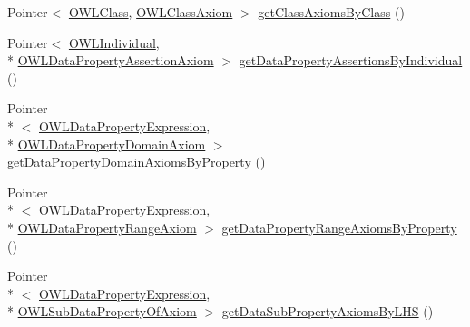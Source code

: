 \begin{DoxyCompactItemize}
\item 
Pointer$<$ \hyperlink{interfaceorg_1_1semanticweb_1_1owlapi_1_1model_1_1_o_w_l_class}{O\-W\-L\-Class}, \hyperlink{interfaceorg_1_1semanticweb_1_1owlapi_1_1model_1_1_o_w_l_class_axiom}{O\-W\-L\-Class\-Axiom} $>$ \hyperlink{interfaceuk_1_1ac_1_1manchester_1_1cs_1_1owl_1_1owlapi_1_1_internals_af7ca9f58be718b9bfabcc28252f50591}{get\-Class\-Axioms\-By\-Class} ()
\item 
Pointer$<$ \hyperlink{interfaceorg_1_1semanticweb_1_1owlapi_1_1model_1_1_o_w_l_individual}{O\-W\-L\-Individual}, \\*
\hyperlink{interfaceorg_1_1semanticweb_1_1owlapi_1_1model_1_1_o_w_l_data_property_assertion_axiom}{O\-W\-L\-Data\-Property\-Assertion\-Axiom} $>$ \hyperlink{interfaceuk_1_1ac_1_1manchester_1_1cs_1_1owl_1_1owlapi_1_1_internals_ae224a024cfa42f2b7fed95f3a96d6c32}{get\-Data\-Property\-Assertions\-By\-Individual} ()
\item 
Pointer\\*
$<$ \hyperlink{interfaceorg_1_1semanticweb_1_1owlapi_1_1model_1_1_o_w_l_data_property_expression}{O\-W\-L\-Data\-Property\-Expression}, \\*
\hyperlink{interfaceorg_1_1semanticweb_1_1owlapi_1_1model_1_1_o_w_l_data_property_domain_axiom}{O\-W\-L\-Data\-Property\-Domain\-Axiom} $>$ \hyperlink{interfaceuk_1_1ac_1_1manchester_1_1cs_1_1owl_1_1owlapi_1_1_internals_aa35c100aca490066ebbd59464cb808f5}{get\-Data\-Property\-Domain\-Axioms\-By\-Property} ()
\item 
Pointer\\*
$<$ \hyperlink{interfaceorg_1_1semanticweb_1_1owlapi_1_1model_1_1_o_w_l_data_property_expression}{O\-W\-L\-Data\-Property\-Expression}, \\*
\hyperlink{interfaceorg_1_1semanticweb_1_1owlapi_1_1model_1_1_o_w_l_data_property_range_axiom}{O\-W\-L\-Data\-Property\-Range\-Axiom} $>$ \hyperlink{interfaceuk_1_1ac_1_1manchester_1_1cs_1_1owl_1_1owlapi_1_1_internals_a5ee110f1db6a236e5c2fa40f7b8a09b1}{get\-Data\-Property\-Range\-Axioms\-By\-Property} ()
\item 
Pointer\\*
$<$ \hyperlink{interfaceorg_1_1semanticweb_1_1owlapi_1_1model_1_1_o_w_l_data_property_expression}{O\-W\-L\-Data\-Property\-Expression}, \\*
\hyperlink{interfaceorg_1_1semanticweb_1_1owlapi_1_1model_1_1_o_w_l_sub_data_property_of_axiom}{O\-W\-L\-Sub\-Data\-Property\-Of\-Axiom} $>$ \hyperlink{interfaceuk_1_1ac_1_1manchester_1_1cs_1_1owl_1_1owlapi_1_1_internals_aa4cdece74b144d8a02192a8cc0376b7a}{get\-Data\-Sub\-Property\-Axioms\-By\-L\-H\-S} ()

\end{DoxyCompactItemize}
